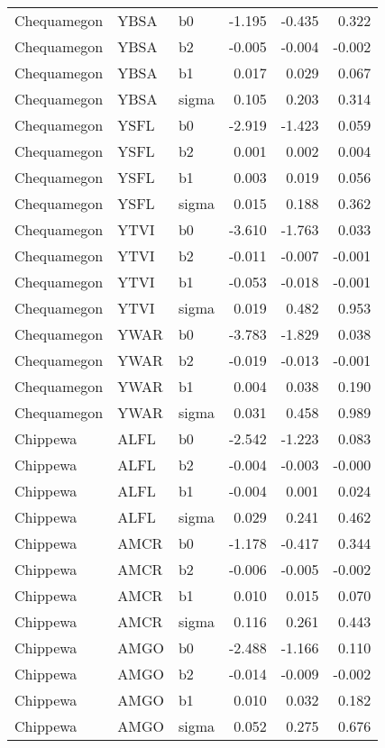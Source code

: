 \begin{table}[ht]
\begin{center}
\begin{tabular}{lllrrr}
  Chequamegon & YBSA & b0 & -1.195 & -0.435 & 0.322 \\ 
  Chequamegon & YBSA & b2 & -0.005 & -0.004 & -0.002 \\ 
  Chequamegon & YBSA & b1 & 0.017 & 0.029 & 0.067 \\ 
  Chequamegon & YBSA & sigma & 0.105 & 0.203 & 0.314 \\ 
  Chequamegon & YSFL & b0 & -2.919 & -1.423 & 0.059 \\ 
  Chequamegon & YSFL & b2 & 0.001 & 0.002 & 0.004 \\ 
  Chequamegon & YSFL & b1 & 0.003 & 0.019 & 0.056 \\ 
  Chequamegon & YSFL & sigma & 0.015 & 0.188 & 0.362 \\ 
  Chequamegon & YTVI & b0 & -3.610 & -1.763 & 0.033 \\ 
  Chequamegon & YTVI & b2 & -0.011 & -0.007 & -0.001 \\ 
  Chequamegon & YTVI & b1 & -0.053 & -0.018 & -0.001 \\ 
  Chequamegon & YTVI & sigma & 0.019 & 0.482 & 0.953 \\ 
  Chequamegon & YWAR & b0 & -3.783 & -1.829 & 0.038 \\ 
  Chequamegon & YWAR & b2 & -0.019 & -0.013 & -0.001 \\ 
  Chequamegon & YWAR & b1 & 0.004 & 0.038 & 0.190 \\ 
  Chequamegon & YWAR & sigma & 0.031 & 0.458 & 0.989 \\ 
  Chippewa & ALFL & b0 & -2.542 & -1.223 & 0.083 \\ 
  Chippewa & ALFL & b2 & -0.004 & -0.003 & -0.000 \\ 
  Chippewa & ALFL & b1 & -0.004 & 0.001 & 0.024 \\ 
  Chippewa & ALFL & sigma & 0.029 & 0.241 & 0.462 \\ 
  Chippewa & AMCR & b0 & -1.178 & -0.417 & 0.344 \\ 
  Chippewa & AMCR & b2 & -0.006 & -0.005 & -0.002 \\ 
  Chippewa & AMCR & b1 & 0.010 & 0.015 & 0.070 \\ 
  Chippewa & AMCR & sigma & 0.116 & 0.261 & 0.443 \\ 
  Chippewa & AMGO & b0 & -2.488 & -1.166 & 0.110 \\ 
  Chippewa & AMGO & b2 & -0.014 & -0.009 & -0.002 \\ 
  Chippewa & AMGO & b1 & 0.010 & 0.032 & 0.182 \\ 
  Chippewa & AMGO & sigma & 0.052 & 0.275 & 0.676 \\ 

\end{tabular}
\end{center}
\end{table}
